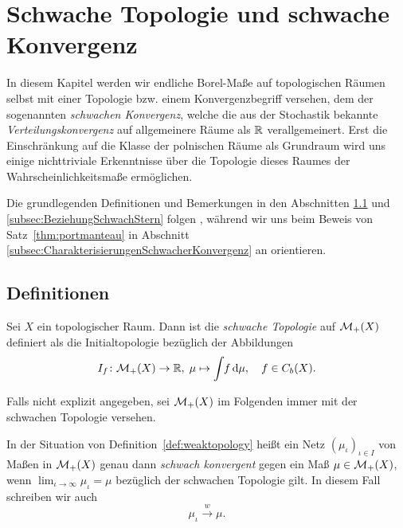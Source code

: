 \documentclass[../main/main.tex]{subfiles}
\begin{document}
	
	\section{Schwache Topologie und schwache Konvergenz}
	
	In diesem Kapitel werden wir endliche Borel-Maße auf topologischen Räumen selbst
	mit einer Topologie bzw. einem Konvergenzbegriff versehen, dem der sogenannten \emph{schwachen Konvergenz}, 
	welche die aus der Stochastik bekannte \emph{Verteilungskonvergenz} auf allgemeinere Räume als $\mathbb{R}$ verallgemeinert. 
	Erst die Einschränkung auf die Klasse der polnischen Räume als Grundraum wird uns einige nichttriviale Erkenntnisse 
	über die Topologie dieses Raumes der Wahrscheinlichkeitsmaße ermöglichen.
	
	Die grundlegenden Definitionen und Bemerkungen in den Abschnitten \ref{subsec:Definition} und \ref{subsec:BeziehungSchwachStern} folgen 
	\cite[Abschnitte 1-3]{Varadarajan.1958}, während wir uns beim Beweis von Satz~\ref{thm:portmanteau} in Abschnitt \ref{subsec:CharakterisierungenSchwacherKonvergenz}
	an \cite[Satz 4.14.4]{Simon.2015} orientieren.

	\subsection{Definitionen}
	\label{subsec:Definition}
	
	\begin{Definition}
		\label{def:weaktopology}
		Sei $X$ ein topologischer Raum. Dann ist die \emph{schwache Topologie} auf $\mathcal{M}_{+}(X)$ definiert als die 
		Initialtopologie bezüglich der Abbildungen
		\[ I_f \colon \mathcal{M}_{+}(X) \to \mathbb{R}, \; \mu \mapsto \int_{} \, f \, \mathrm{d}\mu , \quad f \in C_b(X) \text{.} \]
	\end{Definition}

	Falls nicht explizit angegeben, sei $\mathcal{M}_{+}(X)$ im Folgenden immer mit der schwachen Topologie versehen.

	\begin{Definition}
		In der Situation von Definition~\ref{def:weaktopology} heißt ein Netz $(\mu_\iota)_{\iota \in I}$ von Maßen in $\mathcal{M}_{+}(X)$ genau dann 
		\emph{schwach konvergent} gegen ein Maß $\mu \in \mathcal{M}_{+}(X)$, wenn $\lim_{\iota \to \infty} \mu_\iota = \mu$ bezüglich der schwachen Topologie gilt.
		In diesem Fall schreiben wir auch
		\[ \mu_\iota \xrightarrow{w} \mu \text{.} \]
	\end{Definition}
\end{document}
